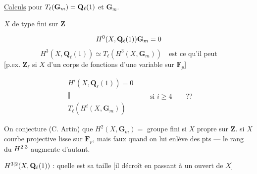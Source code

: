 \uline{Calculs} pour $T_\ell(\mathbf G_m){}=\mathbf Q_\ell(1)$ et $\mathbf G_m$.

$X$ de type fini sur $\mathbf Z$

\[
H^0(X,\mathbf Q_\ell(1))\mathbf G_m=0
\]
\[
H^3(X,\mathbf Q_\ell(1))\simeq T_\ell(H^3(X,\mathbf G_m))\quad\text{est ce qu'il peut}
\]
\hfill [p.ex. $\mathbf Z_\ell$ si $X$   d'un
corps de fonctions d'une variable sur $\mathbf F_p$]

\[
\begin{array}{c}
H^i(X,\mathbf Q_\ell(1))=0\\
\Vert\\
T_\ell(H^i(X,\mathbf G_m))
\end{array}
\qquad\text{si }i\ge4\qquad ??
\]

On conjecture (C. Artin) que $H^2(X,\mathbf G_m)=$ groupe
fini si $X$ propre sur $\mathbf Z$. 
si $X$ courbe projective lisse sur $\mathbf F_p$, mais
faux quand on lui enlève des pts --- le
rang du $H^{2|3}$ augmente d'autant.

$H^{3|2}(X,\mathbf Q_\ell(1))$ : quelle est sa taille [il décroît en
passant à un ouvert de $X$]
